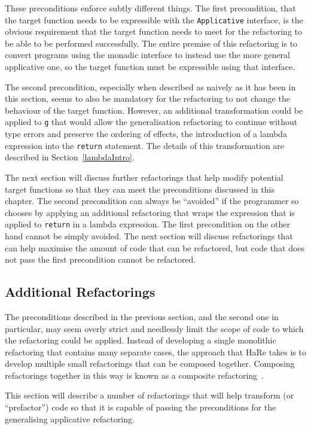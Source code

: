 These preconditions enforce subtly different things. The first precondition, that the target function needs to be expressible with the \texttt{Applicative} interface, is the obvious requirement that the target function needs to meet for the refactoring to be able to be performed successfully. The entire premise of this refactoring is to convert programs using the monadic interface to instead use the more general applicative one, so the target function must be expressible using that interface.

The second precondition, especially when described as naively as it has been in this section, seems to also be mandatory for the refactoring to not change the behaviour of the target function. However, an additional transformation could be applied to \texttt{g} that would allow the generalisation refactoring to continue without type errors and preserve the ordering of effects, the introduction of a lambda expression into the \texttt{return} statement. The details of this transformation are described in Section~\ref{lambdaIntro}.

The next section will discuss further refactorings that help modify potential target functions so that they can meet the preconditions discussed in this chapter. The second precondition can always be ``avoided'' if the programmer so chooses by applying an additional refactoring that wraps the expression that is applied to \texttt{return} in a lambda expression. The first precondition on the other hand cannot be simply avoided. The next section will discuss refactorings that can help maximise the amount of code that can be refactored, but code that does not pass the first precondition cannot be refactored.

\subsection{Additional Refactorings}
\label{sec:otherRefs}
The preconditions described in the previous section, and the second one in particular, may seem overly strict and needlessly limit the scope of code to which the refactoring could be applied. Instead of developing a single monolithic refactoring that contains many separate cases, the approach that HaRe takes is to develop multiple small refactorings that can be composed together. Composing refactorings together in this way is known as a composite refactoring~\citep{wranglerDomain}.

This section will describe a number of refactorings that will help transform (or ``prefactor'') code so that it is capable of passing the preconditions for the generalising applicative refactoring. 

